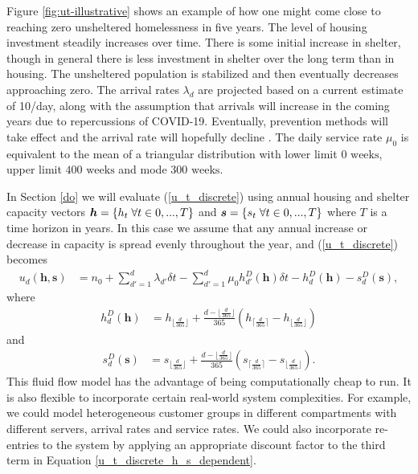 \documentclass[12pt,a4paper]{article}
\begin{document}
Figure \ref{fig:ut-illustrative} shows an example of how one might come close to reaching zero unsheltered homelessness in five years.  The level of housing investment steadily increases over time.  There is some initial increase in shelter, though in general there is less investment in shelter over the long term than in housing.  The unsheltered population is stabilized and then eventually decreases approaching zero.  The arrival rates $\lambda_d$ are projected based on a current estimate of 10/day, along with the assumption that arrivals will increase in the coming years due to repercussions of COVID-19.  Eventually, prevention methods will take effect and the arrival rate will hopefully decline \citep{hometogether2022}. The daily service rate $\mu_0$ is equivalent to the mean of a triangular distribution with lower limit $0 \text{ weeks}$, upper limit $400 \text{ weeks}$ and mode $300 \text{ weeks}$.

In Section \ref{do} we will evaluate (\ref{u_t_discrete}) using annual housing and shelter capacity vectors $\boldsymbol{h} = \{h_t \hspace{0.1cm} \forall t \in 0,...,T\}$ and $\boldsymbol{s} = \{s_t \hspace{0.1cm} \forall t \in 0,...,T\}$ where $T$ is a time horizon in years. In this case we assume that any annual increase or decrease in capacity is spread evenly throughout the year, and (\ref{u_t_discrete}) becomes
%
\begin{align} \label{u_t_discrete_h_s_dependent}
u_d(\boldsymbol{h},\boldsymbol{s}) & = n_0 + \sum_{d'=1}^{d} \lambda_{d'} \delta t - \sum_{d'=1}^{d} \mu_0 h^D_{d'}(\boldsymbol{h}) \delta t - h^D_d(\boldsymbol{h}) - s^D_d(\boldsymbol{s}),
\end{align}
%
where 
%
\begin{align} \label{h_d}
h^D_d(\boldsymbol{h}) & = h_{\lfloor{\frac{d}{365}}\rfloor} + \frac{d-\lfloor\frac{d}{365}\rfloor}{365}(h_{\lceil{\frac{d}{365}}\rceil}-h_{\lfloor{\frac{d}{365}}\rfloor})
\end{align}
%
and
%
\begin{align} \label{s_d}
s^D_d(\boldsymbol{s}) & = s_{\lfloor{\frac{d}{365}}\rfloor} + \frac{d-\lfloor\frac{d}{365}\rfloor}{365}(s_{\lceil{\frac{d}{365}}\rceil}-s_{\lfloor{\frac{d}{365}}\rfloor}).
\end{align}
%
This fluid flow model has the advantage of being computationally cheap to run. It is also flexible to incorporate certain real-world system complexities. For example, we could model heterogeneous customer groups in different compartments with different servers, arrival rates and service rates. We could also incorporate re-entries to the system by applying an appropriate discount factor to the third term in Equation \ref{u_t_discrete_h_s_dependent}. 
\end{document}
